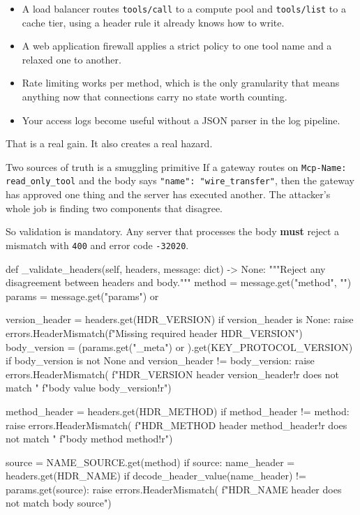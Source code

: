 \begin{itemize}[leftmargin=1.6em, itemsep=3pt]
\item A load balancer routes \texttt{tools/call} to a compute pool and
\texttt{tools/list} to a cache tier, using a header rule it already knows how to
write.
\item A web application firewall applies a strict policy to one tool name and a
relaxed one to another.
\item Rate limiting works per method, which is the only granularity that means
anything now that connections carry no state worth counting.
\item Your access logs become useful without a JSON parser in the log pipeline.
\end{itemize}

That is a real gain. It also creates a real hazard.

\begin{dangerbox}{Two sources of truth is a smuggling primitive}
If a gateway routes on \texttt{Mcp-Name: read\_only\_tool} and the body says
\texttt{"name": "wire\_transfer"}, then the gateway has approved one thing and
the server has executed another. The attacker's whole job is finding two
components that disagree.

So validation is mandatory. Any server that processes the body
\textbf{must} reject a mismatch with \texttt{400} and error code
\texttt{-32020}.
\end{dangerbox}

\begin{py}
def _validate_headers(self, headers, message: dict) -> None:
    """Reject any disagreement between headers and body."""
    method = message.get("method", "")
    params = message.get("params") or {}

    version_header = headers.get(HDR_VERSION)
    if version_header is None:
        raise errors.HeaderMismatch(f"Missing required header {HDR_VERSION}")
    body_version = (params.get("_meta") or {}).get(KEY_PROTOCOL_VERSION)
    if body_version is not None and version_header != body_version:
        raise errors.HeaderMismatch(
            f"{HDR_VERSION} header {version_header!r} does not match "
            f"body value {body_version!r}")

    method_header = headers.get(HDR_METHOD)
    if method_header != method:
        raise errors.HeaderMismatch(
            f"{HDR_METHOD} header {method_header!r} does not match "
            f"body method {method!r}")

    source = NAME_SOURCE.get(method)
    if source:
        name_header = headers.get(HDR_NAME)
        if decode_header_value(name_header) != params.get(source):
            raise errors.HeaderMismatch(
                f"{HDR_NAME} header does not match body {source}")
\end{py}

